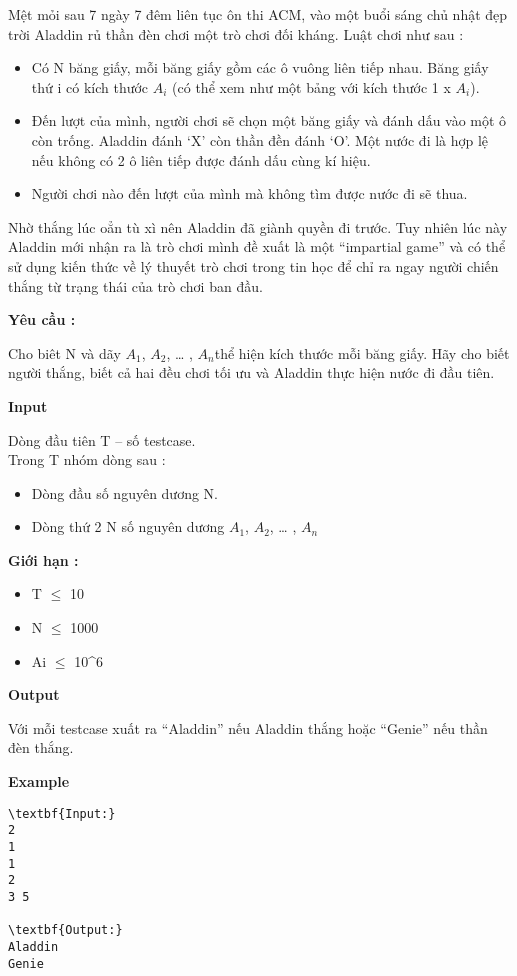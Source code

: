 

Mệt mỏi sau 7 ngày 7 đêm liên tục ôn thi ACM, vào một buổi sáng chủ nhật đẹp trời Aladdin rủ thần đèn chơi một trò chơi đối kháng. Luật chơi như sau :
\begin{itemize}
	\item Có N băng giấy, mỗi băng giấy gồm các ô vuông liên tiếp nhau. Băng giấy thứ i có kích thước $A_{i}$ (có thể xem như một bảng với kích thước 1 x $A_{i}$).
	\item Đến lượt của mình, người chơi sẽ chọn một băng giấy và đánh dấu vào một ô còn trống. Aladdin đánh ‘X’ còn thần đền đánh ‘O’. Một nước đi là hợp lệ nếu không có 2 ô liên tiếp được đánh dấu cùng kí hiệu.
	\item Người chơi nào đến lượt của mình mà không tìm được nước đi sẽ thua.
\end{itemize}

Nhờ thắng lúc oẳn tù xì nên Aladdin đã giành quyền đi trước. Tuy nhiên lúc này Aladdin mới nhận ra là trò chơi mình đề xuất là một “impartial game” và có thể sử dụng kiến thức về lý thuyết trò chơi trong tin học để chỉ ra ngay người chiến thắng từ trạng thái của trò chơi ban đầu.

\textbf{Yêu cầu :}

Cho biêt N và dãy $A_{1}$, $A_{2}$, … , $A_{n}$thể hiện kích thước mỗi băng giấy. Hãy cho biết người thắng, biết cả hai đều chơi tối ưu và Aladdin thực hiện nước đi đầu tiên.

\textbf{Input}

Dòng đầu tiên T – số testcase.
\\Trong T nhóm dòng sau :
\begin{itemize}
	\item Dòng đầu số nguyên dương N.
	\item Dòng thứ 2 N số nguyên dương $A_{1}$, $A_{2}$, … , $A_{n}$
\end{itemize}

\textbf{Giới hạn : }
\begin{itemize}
	\item T  $\le$  10
	\item N  $\le$  1000
	\item Ai  $\le$  10^6
\end{itemize}

\textbf{Output}

Với mỗi testcase xuất ra “Aladdin” nếu Aladdin thắng hoặc “Genie” nếu thần đèn thắng.

\textbf{Example}
\begin{verbatim}
\textbf{Input:}
2
1
1
2
3 5

\textbf{Output:}
Aladdin
Genie\end{verbatim}
